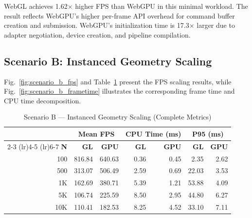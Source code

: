 \documentclass[conference]{IEEEtran}
\begin{document}
WebGL achieves 1.62$\times$ higher FPS than WebGPU in this minimal workload. The result reflects WebGPU's higher per-frame API overhead for command buffer creation and submission. WebGPU's initialization time is 17.3$\times$ larger due to adapter negotiation, device creation, and pipeline compilation.

\subsection{Scenario B: Instanced Geometry Scaling}

Fig.~\ref{fig:scenario_b_fps} and Table~\ref{tab:scenario_b} present the FPS scaling results, while Fig.~\ref{fig:scenario_b_frametime} illustrates the corresponding frame time and CPU time decomposition.

\begin{table}[htbp]
\caption{Scenario B --- Instanced Geometry Scaling (Complete Metrics)}
\label{tab:scenario_b}
\centering
\small
\begin{tabular}{@{}rrrrrrr@{}}
\toprule
 & \multicolumn{2}{c}{\textbf{Mean FPS}} & \multicolumn{2}{c}{\textbf{CPU Time (ms)}} & \multicolumn{2}{c}{\textbf{P95 (ms)}} \\
\cmidrule(lr){2-3} \cmidrule(lr){4-5} \cmidrule(lr){6-7}
\textbf{N} & \textbf{GL} & \textbf{GPU} & \textbf{GL} & \textbf{GPU} & \textbf{GL} & \textbf{GPU} \\
\midrule
100 & 816.84 & 640.63 & 0.36 & 0.45 & 2.35 & 2.62 \\
500 & 313.07 & 506.49 & 2.59 & 0.69 & 22.03 & 3.53 \\
1K & 162.69 & 380.71 & 5.39 & 1.21 & 53.88 & 4.09 \\
5K & 106.74 & 225.59 & 8.50 & 2.95 & 44.80 & 6.27 \\
10K & 110.41 & 182.53 & 8.25 & 4.52 & 33.10 & 7.11 \\
\bottomrule
\end{tabular}
\end{table}
\end{document}
